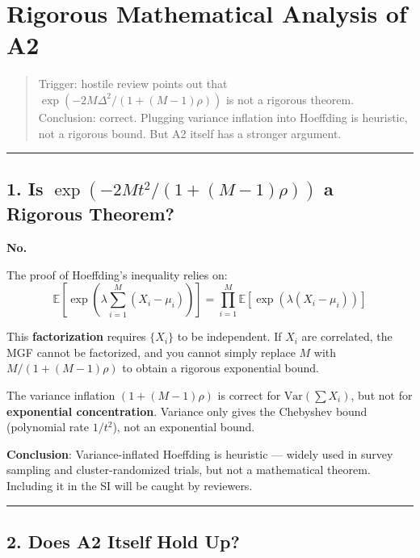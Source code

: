 \documentclass[
  12pt,
]{ctexart}
\author{SCX}
\date{2026}
\begin{document}
\section{Rigorous Mathematical Analysis of A2}\label{rigorous-mathematical-analysis-of-a2}

\begin{quote}
Trigger: hostile review points out that \(\exp(-2M\Delta^2/(1+(M-1)\rho))\) is not a rigorous theorem. Conclusion: correct. Plugging variance inflation into Hoeffding is heuristic, not a rigorous bound. But A2 itself has a stronger argument.
\end{quote}

\begin{center}\rule{0.5\linewidth}{0.5pt}\end{center}

\subsection{\texorpdfstring{1. Is \(\exp(-2M t^2/(1+(M-1)\rho))\) a Rigorous Theorem?}{1. Is exp(-2M t\^{}2/(1+(M-1)rho)) a Rigorous Theorem?}}\label{is-exp-2m-t2-1m-1rho-a-rigorous-theorem}

\textbf{No.}

The proof of Hoeffding's inequality relies on:
\[\mathbb{E}\left[\exp\left(\lambda\sum_{i=1}^M (X_i - \mu_i)\right)\right] = \prod_{i=1}^M \mathbb{E}[\exp(\lambda(X_i - \mu_i))]\]

This \textbf{factorization} requires \(\{X_i\}\) to be independent. If \(X_i\) are correlated, the MGF cannot be factorized, and you cannot simply replace \(M\) with \(M/(1+(M-1)\rho)\) to obtain a rigorous exponential bound.

The variance inflation \((1+(M-1)\rho)\) is correct for \textbf{\(\text{Var}(\sum X_i)\)}, but not for \textbf{exponential concentration}. Variance only gives the Chebyshev bound (polynomial rate \(1/t^2\)), not an exponential bound.

\textbf{Conclusion}: Variance-inflated Hoeffding is heuristic --- widely used in survey sampling and cluster-randomized trials, but not a mathematical theorem. Including it in the SI will be caught by reviewers.

\begin{center}\rule{0.5\linewidth}{0.5pt}\end{center}

\subsection{2. Does A2 Itself Hold Up?}\label{does-a2-itself-hold-up}
\end{document}
